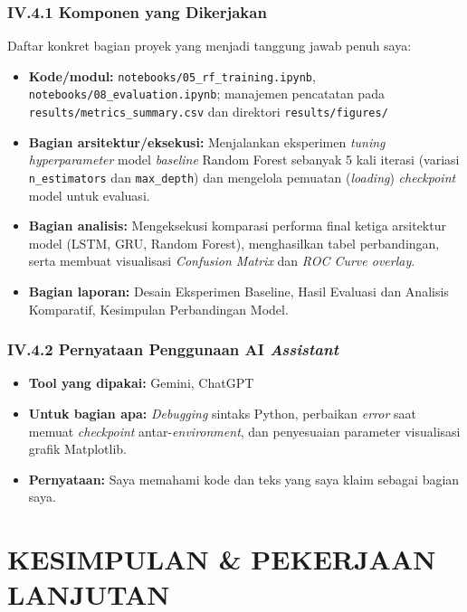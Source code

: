 \documentclass[11pt,a4paper,oneside]{report}
\begin{document}
\subsection*{IV.4.1 Komponen yang Dikerjakan}
Daftar konkret bagian proyek yang menjadi tanggung jawab penuh saya:
\begin{itemize}[leftmargin=*]
    \item \textbf{Kode/modul:} \texttt{notebooks/05\_rf\_training.ipynb}, \texttt{notebooks/08\_evaluation.ipynb}; manajemen pencatatan pada \texttt{results/metrics\_summary.csv} dan direktori \texttt{results/figures/}
    \item \textbf{Bagian arsitektur/eksekusi:} Menjalankan eksperimen \textit{tuning hyperparameter} model \textit{baseline} Random Forest sebanyak 5 kali iterasi (variasi \texttt{n\_estimators} dan \texttt{max\_depth}) dan mengelola pemuatan (\textit{loading}) \textit{checkpoint} model untuk evaluasi.
    \item \textbf{Bagian analisis:} Mengeksekusi komparasi performa final ketiga arsitektur model (LSTM, GRU, Random Forest), menghasilkan tabel perbandingan, serta membuat visualisasi \textit{Confusion Matrix} dan \textit{ROC Curve overlay}.
    \item \textbf{Bagian laporan:} Desain Eksperimen Baseline, Hasil Evaluasi dan Analisis Komparatif, Kesimpulan Perbandingan Model.
\end{itemize}

\subsection*{IV.4.2 Pernyataan Penggunaan AI \textit{Assistant}}
\begin{itemize}[leftmargin=*]
    \item \textbf{Tool yang dipakai:} Gemini, ChatGPT
    \item \textbf{Untuk bagian apa:} \textit{Debugging} sintaks Python, perbaikan \textit{error} saat memuat \textit{checkpoint} antar-\textit{environment}, dan penyesuaian parameter visualisasi grafik Matplotlib.
    \item \textbf{Pernyataan:} Saya memahami kode dan teks yang saya klaim sebagai bagian saya.
\end{itemize}

\chapter{KESIMPULAN \& PEKERJAAN LANJUTAN}
\label{bab:kesimpulan}
\end{document}
